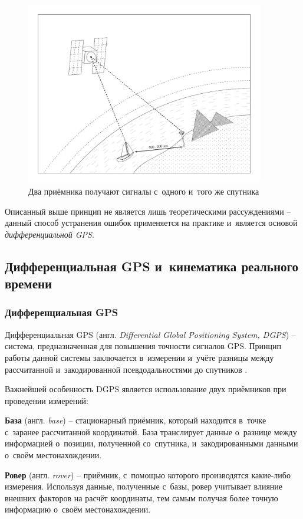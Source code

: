 \begin{figure}[h!]
  \centering
  \setlength{\fboxsep}{5pt}
  \includegraphics[height=8cm]{img/tikz/dgps-one/pic}
  \caption{Два приёмника получают сигналы с~одного и~того же спутника}\label{fig:dgps-one}
\end{figure}

Описанный выше принцип не является лишь теоретическими рассуждениями -- данный способ устранения ошибок применяется на практике и~является основой \emph{дифференциальной GPS}.

\subsection{Дифференциальная GPS и~кинематика реального времени}
\label{subsec:dgps-and-rtk}

\subsubsection{Дифференциальная GPS}
\label{subsec:dgps}

Дифференциальная GPS (англ. \emph{Differential Global Positioning System, DGPS}) -- система, предназначенная для повышения точности сигналов GPS. Принцип работы данной системы заключается в~измерении и~учёте разницы между рассчитанной и~закодированной псевдодальностями до спутников \cite{Trimble}. \par

Важнейшей особенность DGPS является использование двух приёмников при проведении измерений:

\begin{dashitemize}
  \item \textbf{База} (англ. \emph{base}) -- стационарный приёмник, который находится в~точке с~заранее рассчитанной координатой. База транслирует данные о~разнице между информацией о~позиции, полученной со~спутника, и~закодированными данными о~своём местонахождении.
  \item \textbf{Ровер} (англ. \emph{rover}) -- приёмник, с~помощью которого производятся какие-либо измерения. Используя данные, полученные с~базы, ровер учитывает влияние внешних факторов на расчёт координаты, тем самым получая более точную информацию о~своём местонахождении.
\end{dashitemize}

